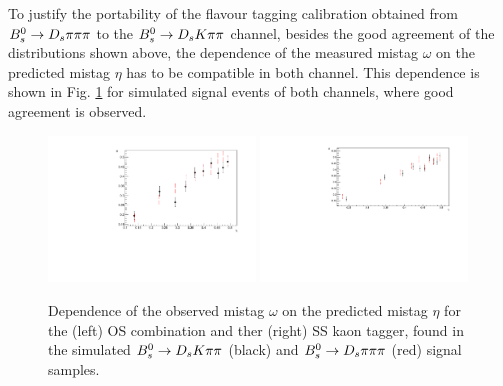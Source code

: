 
To justify the portability of the flavour tagging calibration obtained from ${{B}^0_{s}}\rightarrow{\ensuremath{{D}_{s}}}{\ensuremath{\pi}}{\ensuremath{\pi}}{\ensuremath{\pi}}$ to the ${{B}^0_{s}}\rightarrow{\ensuremath{{D}_{s}}}{\ensuremath{K}}{\ensuremath{\pi}}{\ensuremath{\pi}}$ channel, 
besides the good agreement of the distributions shown above, the dependence of the measured mistag $\omega$ on the predicted mistag $\eta$ has to be compatible in both channel.
This dependence is shown in Fig. \ref{fig:etavsW_mc_comparison} for simulated signal events of both channels, where good agreement is observed. 

\begin{figure}[h]
\includegraphics[height=7.cm,width=0.49\textwidth]{figs/Tagging/OS_combination_MCcomparison.pdf}
\includegraphics[height=7.cm,width=0.49\textwidth]{figs/Tagging/SS_nnetKaon_MCcomparison.pdf}
\caption{Dependence of the observed mistag $\omega$ on the predicted mistag $\eta$ for the (left) OS combination and ther (right) SS kaon tagger, 
found in the simulated ${{B}^0_{s}}\rightarrow{\ensuremath{{D}_{s}}}{\ensuremath{K}}{\ensuremath{\pi}}{\ensuremath{\pi}}$ (black) and ${{B}^0_{s}}\rightarrow{\ensuremath{{D}_{s}}}{\ensuremath{\pi}}{\ensuremath{\pi}}{\ensuremath{\pi}}$ (red) signal samples.}
\label{fig:etavsW_mc_comparison}
\end{figure}


